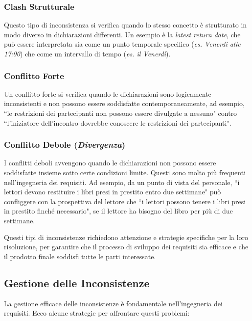 \subsubsection{Clash Strutturale}
Questo tipo di inconsistenza si verifica quando lo stesso concetto è strutturato
in modo diverso in dichiarazioni differenti. Un esempio è la \textit{latest return date},
che può essere interpretata sia come un punto temporale specifico (\textit{es. Venerdì alle 17:00})
che come un intervallo di tempo (\textit{es. il Venerdì}).

\subsubsection{Conflitto Forte}
Un conflitto forte si verifica quando le dichiarazioni sono logicamente inconsistenti
e non possono essere soddisfatte contemporaneamente, ad esempio, ``le restrizioni dei
partecipanti non possono essere divulgate a nessuno" contro ``l'iniziatore dell'incontro
dovrebbe conoscere le restrizioni dei partecipanti".

\subsubsection{Conflitto Debole (\textit{Divergenza})}
I conflitti deboli avvengono quando le dichiarazioni non possono essere soddisfatte
insieme sotto certe condizioni limite. Questi sono molto più frequenti nell'ingegneria 
dei requisiti. Ad esempio,
da un punto di vista del personale, ``i lettori devono restituire i libri presi
in prestito entro due settimane" può confliggere con la prospettiva del lettore che
``i lettori possono tenere i libri presi in prestito finché necessario",
se il lettore ha bisogno del libro per più di due settimane.

Questi tipi di inconsistenze richiedono attenzione e strategie specifiche per la loro
risoluzione, per garantire che il processo di sviluppo dei requisiti sia efficace e
che il prodotto finale soddisfi tutte le parti interessate.

\subsection{Gestione delle Inconsistenze}

La gestione efficace delle inconsistenze è fondamentale nell'ingegneria dei requisiti.
Ecco alcune strategie per affrontare questi problemi:

